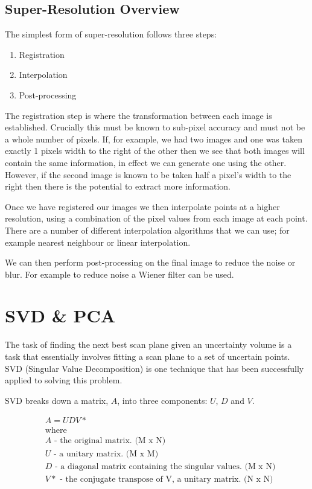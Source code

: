 \subsection*{Super-Resolution Overview}
The simplest form of super-resolution follows three steps:

\begin{enumerate}
	\item Registration
	\item Interpolation
	\item Post-processing
\end{enumerate}

The registration step is where the transformation between each image is established. Crucially this must be known to sub-pixel accuracy and must not be a whole number of pixels. If, for example, we had two images and one was taken exactly 1 pixels width to the right of the other then we see that both images will contain the same information, in effect we can generate one using the other. However, if the second image is known to be taken half a pixel's width to the right then there is the potential to extract more information.

Once we have registered our images we then interpolate points at a higher resolution, using a combination of the pixel values from each image at each point. There are a number of different interpolation algorithms that we can use; for example nearest neighbour or linear interpolation.

We can then perform post-processing on the final image to reduce the noise or blur. For example to reduce noise a Wiener filter can be used\cite{wienerfilter}.

\newpage
\section{SVD \& PCA}\label{background:svdpca}
The task of finding the next best scan plane given an uncertainty volume is a task that essentially involves fitting a scan plane to a set of uncertain points. SVD (Singular Value Decomposition) is one technique that has been successfully applied to solving this problem\cite{uncertaintysvd}.

SVD  breaks down a matrix, $A$, into three components: $U$, $D$ and $V$.

\begin{align}
& A = UDV* \nonumber \\
& \text{where} \nonumber \\
& A \text{ - the original matrix. (M x N)} \nonumber \\
& U \text{ - a unitary matrix. (M x M)} \nonumber \\
& D \text{ - a diagonal matrix containing the singular values. (M x N)} \nonumber \\
& V* \text{ - the conjugate transpose of V, a unitary matrix. (N x N)} \nonumber
\end{align}

